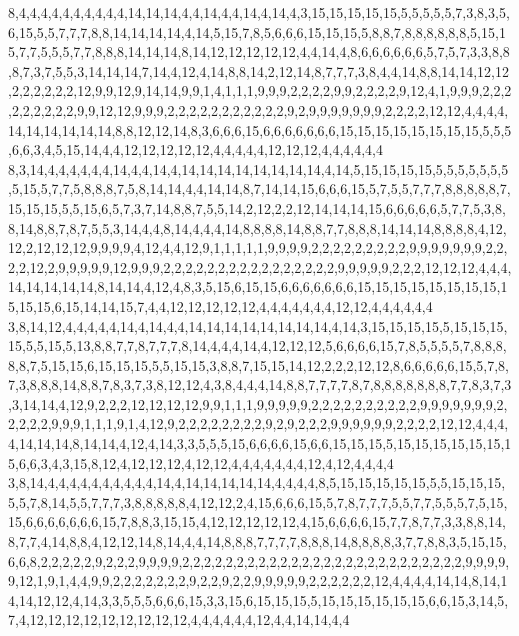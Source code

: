 8,4,4,4,4,4,4,4,4,4,4,14,14,14,4,4,14,4,4,14,4,14,4,3,15,15,15,15,15,5,5,5,5,5,7,3,8,3,5,6,15,5,5,7,7,7,8,8,14,14,14,14,4,14,5,15,7,8,5,6,6,6,15,15,15,5,8,8,7,8,8,8,8,8,8,5,15,15,7,7,5,5,5,7,7,8,8,8,14,14,14,8,14,12,12,12,12,12,4,4,14,4,8,6,6,6,6,6,6,5,7,5,7,3,3,8,8,8,7,3,7,5,5,3,14,14,14,7,14,4,12,4,14,8,8,14,2,12,14,8,7,7,7,3,8,4,4,14,8,8,14,14,12,12,2,2,2,2,2,2,12,9,9,12,9,14,14,9,9,1,4,1,1,1,9,9,9,2,2,2,2,9,9,2,2,2,2,9,12,4,1,9,9,9,2,2,2,2,2,2,2,2,2,9,9,12,12,9,9,9,2,2,2,2,2,2,2,2,2,2,2,9,2,9,9,9,9,9,9,9,2,2,2,2,12,12,4,4,4,4,14,14,14,14,14,14,8,8,12,12,14,8,3,6,6,6,15,6,6,6,6,6,6,6,15,15,15,15,15,15,15,15,5,5,5,6,6,3,4,5,15,14,4,4,12,12,12,12,12,4,4,4,4,4,12,12,12,4,4,4,4,4,4
8,3,14,4,4,4,4,4,4,14,4,4,14,4,14,14,14,14,14,14,14,14,4,14,5,15,15,15,15,5,5,5,5,5,5,5,5,15,5,7,7,5,8,8,8,7,5,8,14,14,4,4,14,14,8,7,14,14,15,6,6,6,15,5,7,5,5,7,7,7,8,8,8,8,8,7,15,15,15,5,5,15,6,5,7,3,7,14,8,8,7,5,5,14,2,12,2,2,12,14,14,14,15,6,6,6,6,6,5,7,7,5,3,8,8,14,8,8,7,8,7,5,5,3,14,4,4,8,14,4,4,4,14,8,8,8,8,14,8,8,7,7,8,8,8,14,14,14,8,8,8,8,4,12,12,2,12,12,12,9,9,9,9,4,12,4,4,12,9,1,1,1,1,1,9,9,9,9,2,2,2,2,2,2,2,2,2,9,9,9,9,9,9,9,2,2,2,2,12,2,9,9,9,9,9,12,9,9,9,2,2,2,2,2,2,2,2,2,2,2,2,2,2,2,2,9,9,9,9,9,2,2,2,12,12,12,4,4,4,14,14,14,14,14,8,14,14,4,12,4,8,3,5,15,6,15,15,6,6,6,6,6,6,6,15,15,15,15,15,15,15,15,15,15,15,6,15,14,14,15,7,4,4,12,12,12,12,12,4,4,4,4,4,4,4,12,12,4,4,4,4,4,4
3,8,14,12,4,4,4,4,4,14,4,14,4,4,14,14,14,14,14,14,14,14,4,14,3,15,15,15,15,5,15,15,15,15,5,5,15,5,13,8,8,7,7,8,7,7,7,8,14,4,4,4,14,4,12,12,12,5,6,6,6,6,15,7,8,5,5,5,5,7,8,8,8,8,8,7,5,15,15,6,15,15,15,5,5,15,15,3,8,8,7,15,15,14,12,2,2,2,12,12,8,6,6,6,6,6,15,5,7,8,7,3,8,8,8,14,8,8,7,8,3,7,3,8,12,12,4,3,8,4,4,4,14,8,8,7,7,7,7,8,7,8,8,8,8,8,8,8,7,7,8,3,7,3,3,14,14,4,12,9,2,2,2,12,12,12,12,9,9,1,1,1,9,9,9,9,9,2,2,2,2,2,2,2,2,2,2,9,9,9,9,9,9,9,2,2,2,2,2,9,9,9,1,1,1,9,1,4,12,9,2,2,2,2,2,2,2,2,9,2,9,2,2,2,9,9,9,9,9,9,2,2,2,2,12,12,4,4,4,4,14,14,14,8,14,14,4,12,4,14,3,3,5,5,5,15,6,6,6,6,15,6,6,15,15,15,5,15,15,15,15,15,15,15,6,6,3,4,3,15,8,12,4,12,12,12,4,12,12,4,4,4,4,4,4,4,12,4,12,4,4,4,4
3,8,14,4,4,4,4,4,4,4,4,4,4,14,4,14,14,14,14,14,4,4,4,4,8,5,15,15,15,15,15,5,5,15,15,15,5,5,7,8,14,5,5,7,7,7,3,8,8,8,8,8,4,12,12,2,4,15,6,6,6,15,5,7,8,7,7,7,5,5,7,7,5,5,5,7,5,15,15,6,6,6,6,6,6,6,15,7,8,8,3,15,15,4,12,12,12,12,12,4,15,6,6,6,6,15,7,7,8,7,7,3,3,8,8,14,8,7,7,4,14,8,8,4,12,12,14,8,14,4,4,14,8,8,8,7,7,7,7,8,8,8,14,8,8,8,8,3,7,7,8,8,3,5,15,15,6,6,8,2,2,2,2,2,9,2,2,2,9,9,9,9,2,2,2,2,2,2,2,2,2,2,2,2,2,2,2,2,2,2,2,2,2,2,2,2,2,2,9,9,9,9,9,12,1,9,1,4,4,9,9,2,2,2,2,2,2,2,9,2,2,9,2,2,9,9,9,9,9,2,2,2,2,2,2,12,4,4,4,4,14,14,8,14,14,14,12,12,4,14,3,3,5,5,5,6,6,6,15,3,3,15,6,15,15,15,5,15,15,15,15,15,15,6,6,15,3,14,5,7,4,12,12,12,12,12,12,12,12,12,4,4,4,4,4,4,12,4,4,14,14,4,4
